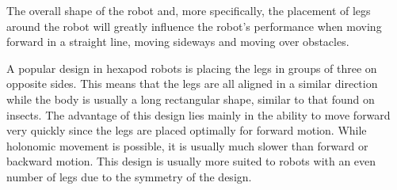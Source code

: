 The overall shape of the robot and, more specifically, the placement of legs around the robot will greatly influence the robot's performance when moving forward in a straight line, moving sideways and moving over obstacles.

A popular design in hexapod robots is placing the legs in groups of three on opposite sides. This means that the legs are all aligned in a similar direction while the body is usually a long rectangular shape, similar to that found on insects. The advantage of this design lies mainly in the ability to move forward very quickly since the legs are placed optimally for forward motion. While holonomic movement is possible, it is usually much slower than forward or backward motion. This design is usually more suited to robots with an even number of legs due to the symmetry of the design.

